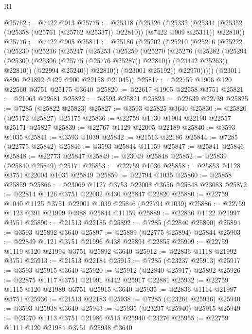 \begin{lexlean}{R1}
\begin{coremodule}
@25762 := @7422 @913
@25775 := @25318
    (@25326
      (@25332
        (@25344 (@25352 (@25358 (@25761 (@25762 @25337)) @22810)) (@7422 @909 @25311))
        @22810))
@25776 := @7422 @905
@25811 := @25186
    (@25202
      (@25210
        (@25216
          (@25222
            (@25230
              (@25236
                (@25247
                  (@25253
                    (@25259
                      (@25270
                        (@25276
                          (@25282
                            (@25294
                              (@25300 (@25306 (@25775 (@25776 @25287)) @22810))
                              (@24442 @25263))
                            @22810))
                        (@22994 @25240))
                      @22810))
                  (@23001 @25192))
                @22970)))))
      (@23011 @896 @21892 @429 @900 @22158 @21045))
@25817 := @22759 @1906 @120 @22560 @3751 @25175 @3640
@25820 := @22617 @1905 @22558 @3751
@25821 := @21063 @22681
@25822 := @3593 @25821
@25823 := @22639 @22739
@25825 := @7285 (@25822 @25823)
@25827 := @3593 @25825 @3640
@25830 := @25820 (@25172 @25827) @25175
@25836 := @22759 @1130 @1904 @22190 @22557 @25171 @25827
@25839 := @22767 @1129 @22005 @22189
@25840 := @3593 @1035
@25841 := @3593 @1039
@25842 := @21513 @22186
@25844 := @7285 (@22775 @25842)
@25846 := @3593 @25844 @11159
@25847 := @25841 @25846
@25848 := @22773 @25847
@25849 := @23049 @25848
@25852 := @25839 (@25840 @25849) @25171
@25853 := @22759 @1036
@25858 := @25853 @1128 @3751 @22004 @1035 @25849
@25859 := @22794 @1035
@25860 := @25858 @25859
@25866 := @23069 @1127 @3753 @22003 @3656 @25848 @23083
@25872 := @22814 @1126 @3751 @22002 @430 @25847 @22820
@25880 := @22759 @1040 @1125 @3751 @22001 @1039 @25846 (@22794 @1039)
@25886 := @22759 @1123 @391 @21999 @4988 @25844 @11159
@25889 := @22836 @1122 @21997 @3751
@25890 := @21513 @22185
@25892 := @7285 (@22840 @25890)
@25894 := @3593 @25892 @3640
@25897 := @25889 (@22775 @25894) @25844
@25903 := @22849 @1121 @3751 @21996 @438 @25894 @22855
@25909 := @22759 @1119 @120 @21994 @3751 @25892 @3640
@25912 := @22836 @1118 @21992 @3751
@25913 := @21513 @22184
@25915 := @7285 (@23237 @25913)
@25917 := @3593 @25915 @3640
@25920 := @25912 (@22840 @25917) @25892
@25926 := @22875 @1117 @3751 @21991 @442 @25917 @22881
@25932 := @22759 @1115 @120 @21989 @3751 @25915 @3640
@25935 := @22836 @1114 @21987 @3751
@25936 := @21513 @22183
@25938 := @7285 (@23261 @25936)
@25940 := @3593 @25938 @3640
@25943 := @25935 (@23237 @25940) @25915
@25949 := @23270 @1113 @3751 @21986 @515 @25940 @23276
@25955 := @22759 @1111 @120 @21984 @3751 @25938 @3640

\end{coremodule}
\end{lexlean}
